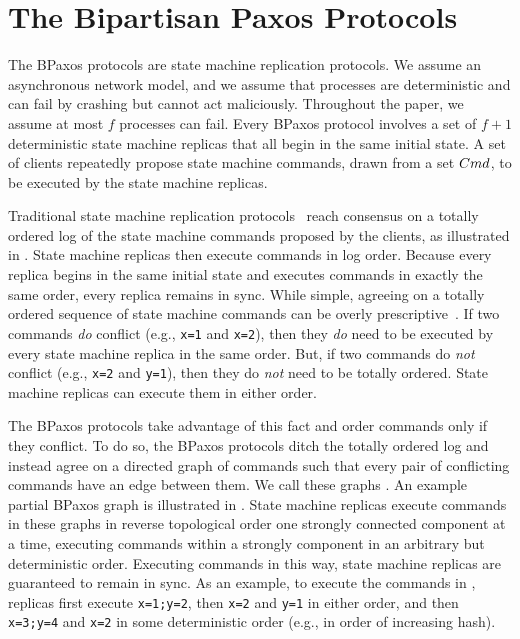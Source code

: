 \section{The Bipartisan Paxos Protocols}
The BPaxos protocols are state machine replication protocols. We assume an
asynchronous network model, and we assume that processes are deterministic and
can fail by crashing but cannot act maliciously. Throughout the paper, we
assume at most $f$ processes can fail. Every BPaxos protocol involves a set of
$f + 1$ deterministic state machine replicas that all begin in the same initial
state. A set of clients repeatedly propose state machine commands, drawn from a
set $Cmd$, to be executed by the state machine replicas.



Traditional state machine replication protocols~\cite{liskov2012viewstamped,
lamport1998part} reach consensus on a totally ordered log of the state machine
commands proposed by the clients, as illustrated in . State
machine replicas then execute commands in log order. Because every replica
begins in the same initial state and executes commands in exactly the same
order, every replica remains in sync.
%
While simple, agreeing on a totally ordered sequence of state machine commands
can be overly prescriptive~\cite{lamport2005generalized, moraru2013there}. If
two commands \emph{do} conflict (e.g., \texttt{x=1} and \texttt{x=2}), then
they \emph{do} need to be executed by every state machine replica in the same
order.  But, if two commands do \emph{not} conflict (e.g., \texttt{x=2} and
\texttt{y=1}), then they do \emph{not} need to be totally ordered. State
machine replicas can execute them in either order.

The BPaxos protocols take advantage of this fact and order commands only if
they conflict. To do so, the BPaxos protocols ditch the totally ordered log and
instead agree on a directed graph of commands such that every pair of
conflicting commands have an edge between them. We call these graphs
. An example partial BPaxos graph is illustrated
in . State machine replicas execute commands in these graphs
in reverse topological order one strongly connected component at a time,
executing commands within a strongly component in an arbitrary but
deterministic order. Executing commands in this way, state machine replicas are
guaranteed to remain in sync. As an example, to execute the commands in
, replicas first execute \texttt{x=1;y=2}, then \texttt{x=2}
and \texttt{y=1} in either order, and then \texttt{x=3;y=4} and \texttt{x=2} in
some deterministic order (e.g., in order of increasing hash).

